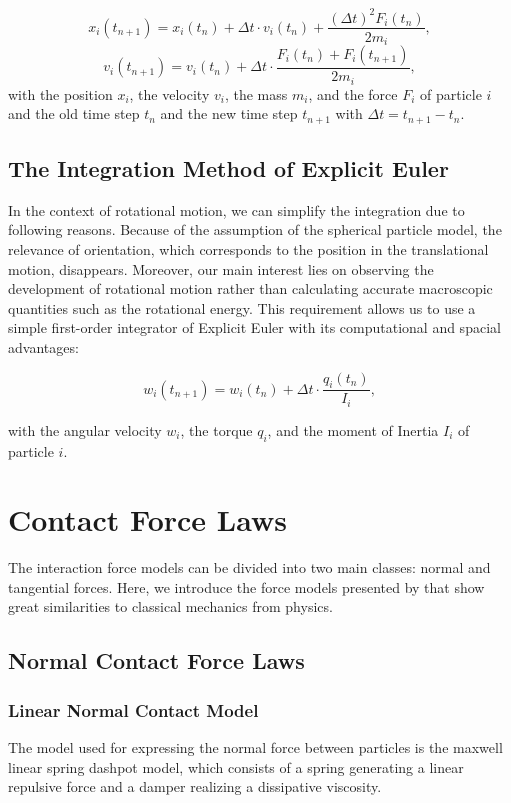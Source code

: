 \documentclass[11pt,
               a4paper,
               bibtotoc,
               idxtotoc,
               headsepline,
               footsepline,
               footexclude,
               BCOR12mm,
               DIV13,
               openany,   %
               ]
               {scrbook}
\begin{document}
\begin{equation}
	x_i(t_{n+1}) = x_i(t_n) + \Delta t \cdot v_i(t_n) + \frac{(\Delta t)^2 F_i(t_n)}{2m_i}, 
\end{equation}
\begin{equation}
	v_i(t_{n+1}) = v_i(t_n) + \Delta t \cdot \frac{F_i(t_n) + F_i(t_{n+1})}{2m_i},
\end{equation}
with the position $x_i$, the velocity $v_i$, the mass $m_i$, and the force $F_i$ of particle $i$ and the old time step $t_n$ and the new time step $t_{n+1}$ with $\Delta t = t_{n+1} - t_n$.

\section{The Integration Method of Explicit Euler}
In the context of rotational motion, we can simplify the integration due to following reasons. Because of the assumption of the spherical particle model, the relevance of orientation, which corresponds to the position in the translational motion, disappears. Moreover, our main interest lies on observing the development of rotational motion rather than calculating accurate macroscopic quantities such as the rotational energy. This requirement allows us to use a simple first-order integrator of Explicit Euler with its computational and spacial advantages:

\begin{equation}
	w_i(t_{n+1}) = w_i(t_n) + \Delta t \cdot \frac{q_i(t_n)}{I_i},
\end{equation}

with the angular velocity $w_i$, the torque $q_i$, and the moment of Inertia $I_i$ of particle $i$.

\chapter{Contact Force Laws}

The interaction force models can be divided into two main classes: normal and tangential forces. Here, we introduce the force models presented by \cite{Luding2008} that show great similarities to classical mechanics from physics.

\section{Normal Contact Force Laws}
\subsection{Linear Normal Contact Model}
The model used for expressing the normal force between particles is the maxwell linear spring dashpot model, which consists of a spring generating a linear repulsive force and a damper realizing a dissipative viscosity.
\end{document}
